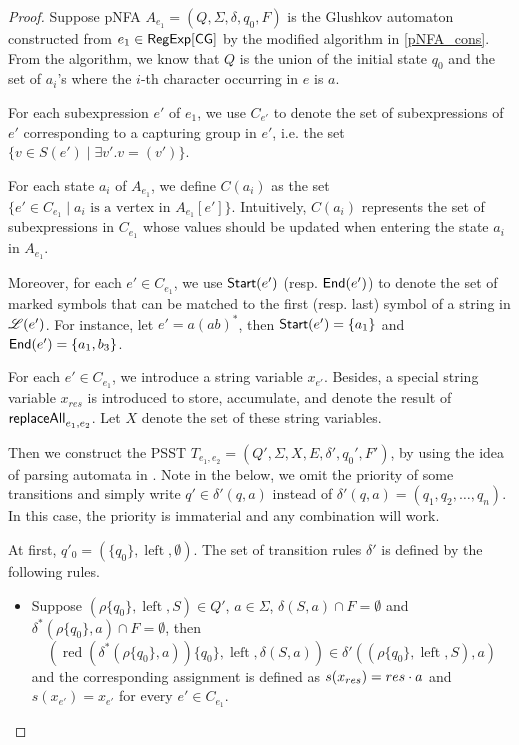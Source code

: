 \documentclass[sigplan,review,anonymous]{acmart}\settopmatter{printfolios=true,printccs=false,printacmref=false}
\newcommand{\tmop}[1]{\ensuremath{\operatorname{#1}}}
\newcommand\PSST{{\sf PSST}}
\newcommand\ssym{{\sf Start}}
\newcommand\esym{{\sf End}}
\begin{document}
\begin{proof}

Suppose pNFA $A_{e_1} =(Q, \Sigma,  \delta, q_0, F)$ is the Glushkov automaton constructed from $e_1 \in {\sf RegExp}[\sf CG]$ by the modified algorithm in \ref{pNFA_cons}. From the algorithm, we know that $Q$ is the union of the initial state $q_0$ and the set of $a_i$'s where the $i$-th character occurring in $e$ is $a$.

For each subexpression $e'$ of $e_1$, we use $C_{e'}$ to denote the set of subexpressions of $e'$ corresponding to a capturing group in $e'$, i.e. the set $\{v \in S(e')\mid \exists v'. v=(v')\}$.

For each state $a_i$ of $A_{e_1}$, we define $C(a_i)$  as the set $\{ e' \in C_{e_1} \mid a_i \mbox{ is a vertex in }
A_{e_1}[e']\}$. Intuitively, $C(a_i)$ represents the set of subexpressions in $C_{e_1}$ whose values should be updated when entering the state $a_i$ in $A_{e_1}$. 

Moreover, for each $e' \in C_{e_1}$, we use $\ssym(e')$ (resp. $\esym(e')$) to denote the set of marked symbols that can be matched to the first  (resp. last) symbol of a string in $\mathscr{L}(e')$. For instance, let $e' = a(ab)^*$, then $\ssym(e') = \{a_1\}$ and $\esym(e') = \{a_1, b_3\}$. 

For each $e' \in C_{e_1}$, we introduce a string variable $x_{e'}$. Besides, a special string variable $x_{res}$ is introduced to store, accumulate, and denote the result of $\mathsf{replaceAll}_{e_1,e_2}$. Let $X$ denote the set of these string variables.


Then we construct the \PSST{} $T_{e_1,e_2} = (Q', \Sigma, X, E, \delta', q_0', F')$, by using the idea of parsing automata in \cite{CCH+18}. Note in the below, we omit the priority of some transitions and simply write $q' \in \delta'(q,a)$ instead of $\delta'(q,a)=(q_1,q_2,\ldots,q_n)$. In this case, the priority is immaterial and any combination will work.

At first, $q'_0= (\{ q_0
\}, \tmop{left}, \emptyset)$. The set of transition rules $\delta'$ is defined by the following rules.

\begin{itemize}
  
  \item Suppose $(\rho \{ q_0 \}, \tmop{left}, S) \in Q'$, $a \in \Sigma$,
  $\delta (S, a) \cap F = \emptyset$ and $\delta^{\ast} (\rho \{ q_0 \}, a) \cap F =
  \emptyset$, then
  \[ (\tmop{red} (\delta^{\ast} (\rho \{ q_0 \}, a)) \{ q_0 \}, \tmop{left}, \delta
     (S, a)) \in \delta' ((\rho \{ q_0 \}, \tmop{left}, S), a) \]
  and the corresponding assignment is defined as $s(x_{res}) = res \cdot a$ and $s(x_{e'})=x_{e'}$ for
  every $e' \in C_{e_1}$.
  

\end{itemize}
\end{proof}
\end{document}
